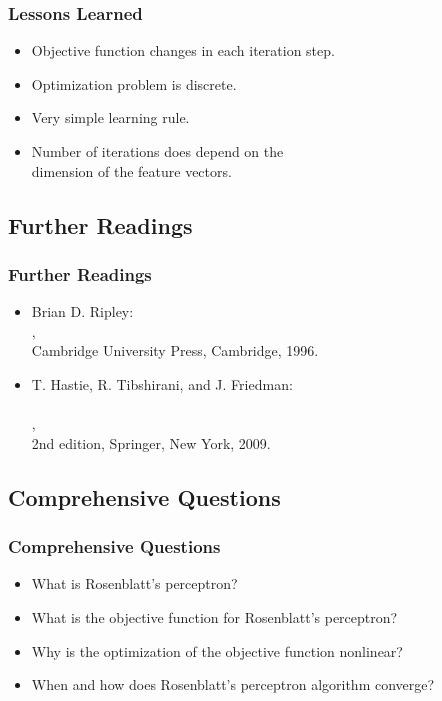 \begin{frame}
  \frametitle{Lessons Learned}

  \begin{itemize}
    \item Objective function changes in each iteration step. \\[.5cm]
    \item Optimization problem is discrete. \\[.5cm]
    \item Very simple learning rule. \\[.5cm]
    \item \vorsicht {} Number of iterations does  depend on the \\
      dimension of the feature vectors.
  \end{itemize}
\end{frame}



\subsection{Further Readings}

\begin{frame}
  \frametitle{Further Readings}

  \begin{itemize}
    \item Brian D. Ripley: \\
      , \\
      Cambridge University Press, Cambridge, 1996.\\[.3cm]
    \item T. Hastie, R. Tibshirani, and J. Friedman: \\
      \\
      ,\\
      2nd edition, Springer, New York, 2009.
  \end{itemize}
\end{frame}


\subsection{Comprehensive Questions}

\begin{frame}
  \frametitle{Comprehensive Questions}

  \begin{itemize}
    \item What is Rosenblatt's perceptron? \\[1cm]
    \item What is the objective function for Rosenblatt's perceptron? \\[1cm]
    \item Why is the optimization of the objective function nonlinear? \\[1cm]
    \item When and how does Rosenblatt's perceptron algorithm converge?
  \end{itemize}
\end{frame}
